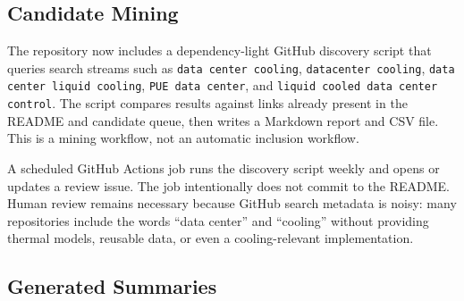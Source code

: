 \documentclass[11pt]{article}
\begin{document}
\subsection{Candidate Mining}

The repository now includes a dependency-light GitHub discovery script that queries search streams such as \texttt{data center cooling}, \texttt{datacenter cooling}, \texttt{data center liquid cooling}, \texttt{PUE data center}, and \texttt{liquid cooled data center control}. The script compares results against links already present in the README and candidate queue, then writes a Markdown report and CSV file. This is a mining workflow, not an automatic inclusion workflow.

A scheduled GitHub Actions job runs the discovery script weekly and opens or updates a review issue. The job intentionally does not commit to the README. Human review remains necessary because GitHub search metadata is noisy: many repositories include the words ``data center'' and ``cooling'' without providing thermal models, reusable data, or even a cooling-relevant implementation.

\subsection{Generated Summaries}
\end{document}

